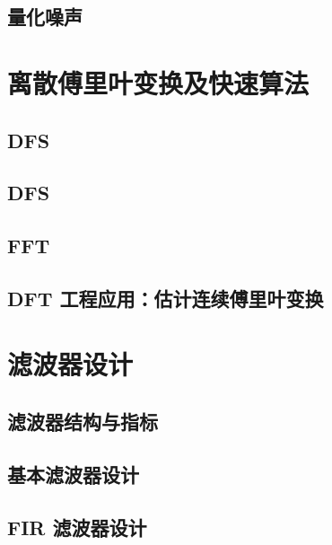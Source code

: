 \documentclass[en,11pt,english,black,simple,device=ppt]{elegantbook}
\begin{document}


\section{量化噪声}



\chapter{离散傅里叶变换及快速算法}

\section{DFS}



\section{DFS}



\section{FFT}




\section{DFT 工程应用：估计连续傅里叶变换}



\chapter{滤波器设计}

\section{滤波器结构与指标}



\section{基本滤波器设计}



\section{FIR 滤波器设计}


\end{document}
